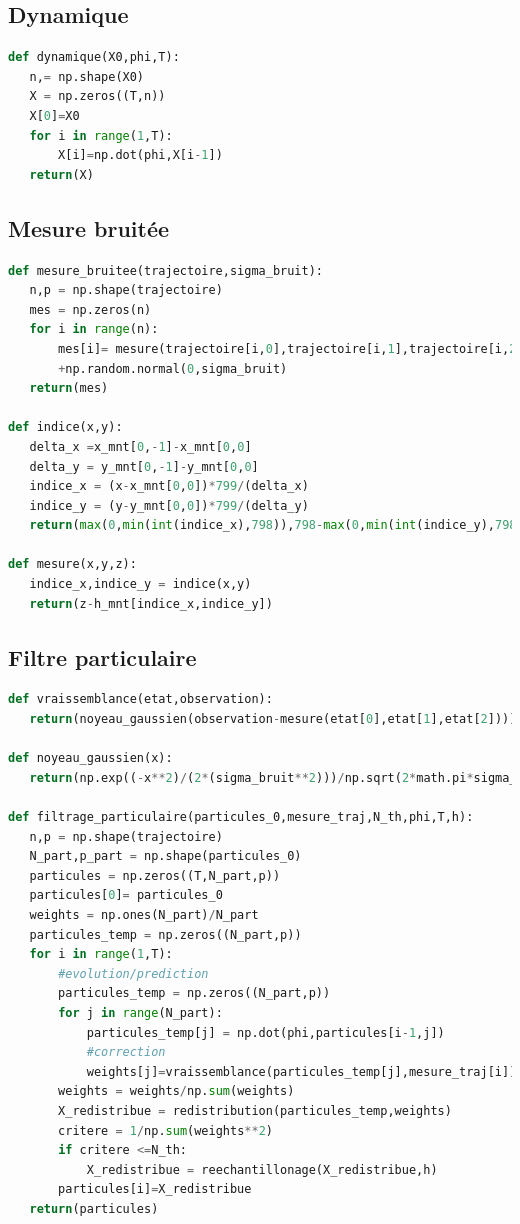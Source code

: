 \documentclass{article}
\begin{document}
\begin{appendices}
\subsection{Dynamique}
\begin{lstlisting}[language=Python]
def dynamique(X0,phi,T):
   n,= np.shape(X0)
   X = np.zeros((T,n))
   X[0]=X0
   for i in range(1,T):
       X[i]=np.dot(phi,X[i-1])
   return(X)    
\end{lstlisting}

\subsection{Mesure bruitée}
\begin{lstlisting}[language=Python]
def mesure_bruitee(trajectoire,sigma_bruit):
   n,p = np.shape(trajectoire)
   mes = np.zeros(n)
   for i in range(n):
       mes[i]= mesure(trajectoire[i,0],trajectoire[i,1],trajectoire[i,2])
       +np.random.normal(0,sigma_bruit)
   return(mes)

def indice(x,y):
   delta_x =x_mnt[0,-1]-x_mnt[0,0]
   delta_y = y_mnt[0,-1]-y_mnt[0,0]
   indice_x = (x-x_mnt[0,0])*799/(delta_x)
   indice_y = (y-y_mnt[0,0])*799/(delta_y)
   return(max(0,min(int(indice_x),798)),798-max(0,min(int(indice_y),798)))

def mesure(x,y,z):
   indice_x,indice_y = indice(x,y)
   return(z-h_mnt[indice_x,indice_y])
\end{lstlisting}

\subsection{Filtre particulaire}
\begin{lstlisting}[language=Python]
def vraissemblance(etat,observation):
   return(noyeau_gaussien(observation-mesure(etat[0],etat[1],etat[2])))

def noyeau_gaussien(x):
   return(np.exp((-x**2)/(2*(sigma_bruit**2)))/np.sqrt(2*math.pi*sigma_bruit))

def filtrage_particulaire(particules_0,mesure_traj,N_th,phi,T,h):
   n,p = np.shape(trajectoire)
   N_part,p_part = np.shape(particules_0)
   particules = np.zeros((T,N_part,p))
   particules[0]= particules_0
   weights = np.ones(N_part)/N_part
   particules_temp = np.zeros((N_part,p))
   for i in range(1,T):
       #evolution/prediction
       particules_temp = np.zeros((N_part,p))
       for j in range(N_part):
           particules_temp[j] = np.dot(phi,particules[i-1,j])
           #correction
           weights[j]=vraissemblance(particules_temp[j],mesure_traj[i])
       weights = weights/np.sum(weights)
       X_redistribue = redistribution(particules_temp,weights)
       critere = 1/np.sum(weights**2)
       if critere <=N_th:
           X_redistribue = reechantillonage(X_redistribue,h)
       particules[i]=X_redistribue
   return(particules)

\end{lstlisting}
\end{appendices}
\end{document}
